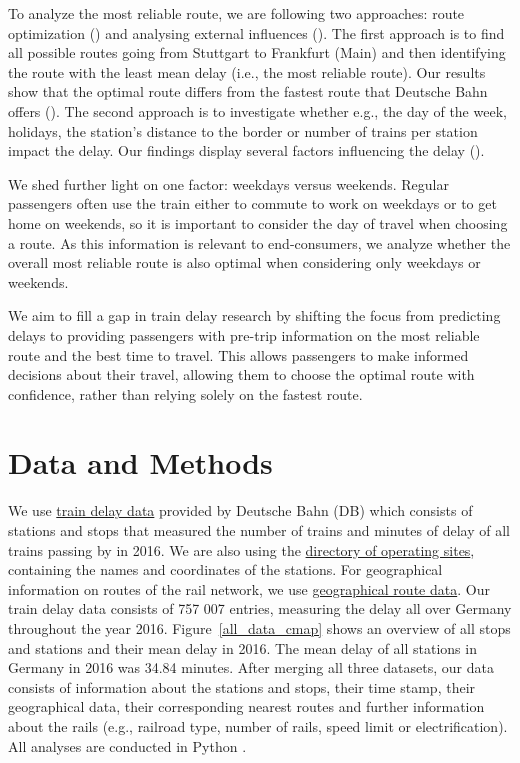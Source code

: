 \documentclass{article}
\theoremstyle{plain}
\theoremstyle{definition}
\theoremstyle{remark}
\begin{document}
	To analyze the most reliable route, we are following two approaches: route optimization () and analysing external influences (). The first approach is to find all possible routes going from Stuttgart to Frankfurt (Main) and then identifying the route with the least mean delay (i.e., the most reliable route). Our results show that the optimal route differs from the fastest route that Deutsche Bahn offers (). The second approach is to investigate whether e.g., the day of the week, holidays, the station's distance to the border or number of trains per station impact the delay. Our findings display several factors influencing the delay ().
	
	We shed further light on one factor: weekdays versus weekends. Regular passengers often use the train either to commute to work on weekdays or to get home on weekends, so it is important to consider the day of travel when choosing a route. As this information is relevant to end-consumers, we analyze whether the overall most reliable route is also optimal when considering only weekdays or weekends.
	
	We aim to fill a gap in train delay research by shifting the focus from predicting delays to providing passengers with pre-trip information on the most reliable route and the best time to travel. This allows passengers to make informed decisions about their travel, allowing them to choose the optimal route with confidence, rather than relying solely on the fastest route.
	
	
	\section{Data and Methods}\label{sec:methods}
	
	We use \href{https://data.deutschebahn.com/dataset/ist-verkehrsdaten-der-db-cargo-auf-bst8-ebene.html}{train delay data} provided by Deutsche Bahn (DB) which consists of stations and stops that measured the number of trains and minutes of delay of all trains passing by in 2016. We are also using the \href{https://data.deutschebahn.com/dataset/betriebsstellen-gueterverkehr.html}{directory of operating sites}, containing the names and coordinates of the stations. For geographical information on routes of the rail network, we use \href{https://data.deutschebahn.com/dataset/betriebsstellen-gueterverkehr.html}{geographical route data}. Our train delay data consists of 757 007 entries, measuring the delay all over Germany throughout the year 2016. Figure~\ref{all_data_cmap} shows an overview of all stops and stations and their mean delay in 2016. The mean delay of all stations in Germany in 2016 was 34.84 minutes. After merging all three datasets, our data consists of information about the stations and stops, their time stamp, their geographical data, their corresponding nearest routes and further information about the rails (e.g., railroad type, number of rails, speed limit or electrification). All analyses are conducted in Python \cite{1995python}.
	
\end{document}
